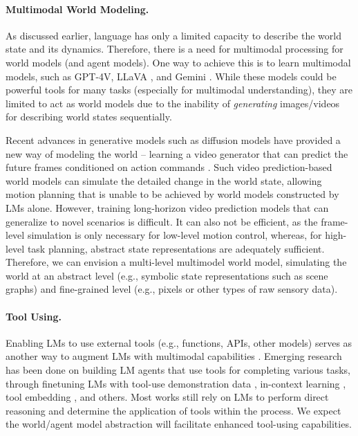 \documentclass{article}
\begin{document}
\paragraph{Multimodal World Modeling.} 
As discussed earlier, language has only a limited capacity to describe the world state and its dynamics. Therefore, there is a need for multimodal processing for world models (and agent models). One way to achieve this is to learn multimodal models, such as GPT-4V, LLaVA \citep{liu2023visual}, and Gemini \citep{Gemini2023}. While these models could be powerful tools for many tasks (especially for multimodal understanding), they are limited to act as world models due to the inability of {\it generating} images/videos for describing world states sequentially.

Recent advances in generative models such as diffusion models have provided a new way of modeling the world -- learning a video generator that can predict the future frames conditioned on action commands \citep[e.g.,][]{yang2023learning,hu2023gaia}. Such video prediction-based world models can simulate the detailed change in the world state, allowing motion planning that is unable to be achieved by world models constructed by LMs alone. However, training long-horizon video prediction models that can generalize to novel scenarios is difficult. It can also not be efficient, 
as the frame-level simulation is only necessary for low-level motion control, whereas, for high-level task planning, abstract state representations are adequately sufficient.
Therefore, we can envision a multi-level multimodel world model,
simulating the world at an abstract level (e.g., symbolic state representations such as scene graphs) and fine-grained level (e.g., pixels or other types of raw sensory data).


\paragraph{Tool Using. }
Enabling LMs to use external tools (e.g., functions, APIs, other models) serves as another way to augment LMs with multimodal capabilities \citep{AutoGPT,openai2022chatgptplugins}. Emerging research has been done on building LM agents that use tools for completing various tasks, through finetuning LMs with tool-use demonstration data \citep{schick2023toolformer,patil2023gorilla}, in-context learning \citep{yao2023react,paranjape2023art}, tool embedding \citep{hao2023toolkengpt}, and others. Most works still rely on LMs to perform direct reasoning and determine the application of tools within the process. We expect the world/agent model abstraction will facilitate enhanced tool-using capabilities.
\end{document}
